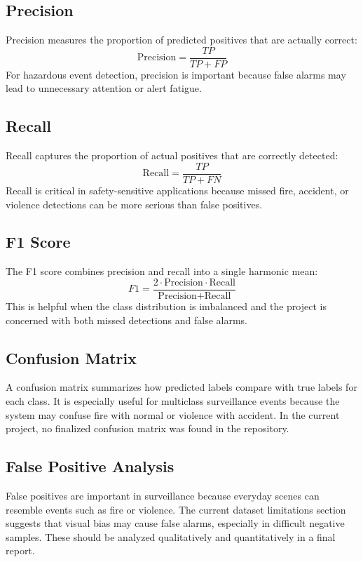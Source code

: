 \documentclass[11pt,a4paper]{article}
\begin{document}
\subsection{Precision}
Precision measures the proportion of predicted positives that are actually correct:
\begin{equation}
\text{Precision} = \frac{TP}{TP + FP}
\end{equation}
For hazardous event detection, precision is important because false alarms may lead to unnecessary attention or alert fatigue.

\subsection{Recall}
Recall captures the proportion of actual positives that are correctly detected:
\begin{equation}
\text{Recall} = \frac{TP}{TP + FN}
\end{equation}
Recall is critical in safety-sensitive applications because missed fire, accident, or violence detections can be more serious than false positives.

\subsection{F1 Score}
The F1 score combines precision and recall into a single harmonic mean:
\begin{equation}
F1 = \frac{2 \cdot \text{Precision} \cdot \text{Recall}}{\text{Precision} + \text{Recall}}
\end{equation}
This is helpful when the class distribution is imbalanced and the project is concerned with both missed detections and false alarms.

\subsection{Confusion Matrix}
A confusion matrix summarizes how predicted labels compare with true labels for each class. It is especially useful for multiclass surveillance events because the system may confuse fire with normal or violence with accident. In the current project, no finalized confusion matrix was found in the repository.

\subsection{False Positive Analysis}
False positives are important in surveillance because everyday scenes can resemble events such as fire or violence. The current dataset limitations section suggests that visual bias may cause false alarms, especially in difficult negative samples. These should be analyzed qualitatively and quantitatively in a final report.
\end{document}
